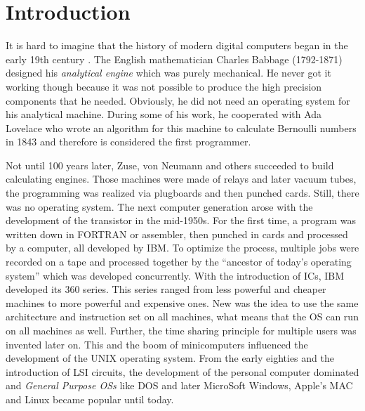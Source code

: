 \chapter{Introduction}
It is hard to imagine that the history of modern digital computers began in the early 19th century \cite{tanenbaum:mos}.
The English mathematician Charles Babbage (1792-1871) designed his \textit{analytical engine} which was purely mechanical. 
He never got it working though because it was not possible to produce the high precision components that he needed.  Obviously, he did not need an operating system for his analytical machine.
During some of his work, he cooperated with Ada Lovelace who wrote an algorithm for this machine to calculate Bernoulli numbers in 1843 \cite{toole:ateon} and therefore is considered the first programmer.
\par
Not until 100 years later, Zuse, von Neumann and others succeeded to build calculating engines. 
Those machines were made of relays and later vacuum tubes, the programming was realized via plugboards and then punched cards.
Still, there was no operating system.
The next computer generation arose with the development of the transistor in the mid-1950s.
For the first time, a program was written down in FORTRAN or assembler, then punched in cards and processed by a computer, all developed by IBM. 
To optimize the process, multiple jobs were recorded on a tape and processed together by the ``ancestor of today's operating system'' \cite{tanenbaum:mos} which was developed concurrently.
With the introduction of \acp{IC}, IBM developed its 360 series.
This series ranged from less powerful and cheaper machines to more powerful and expensive ones.
New was the idea to use the same architecture and instruction set on all machines, what means that the \ac{OS} can run on all machines as well.
Further, the time sharing principle for multiple users was invented later on.
This and the boom of minicomputers influenced the development of the UNIX operating system.
From the early eighties and the introduction of \ac{LSI} circuits, the development of the personal computer dominated and \textit{General Purpose \acp{OS}} like \ac{DOS} and later MicroSoft Windows, Apple's \ac{MAC} and Linux became popular until today. 

